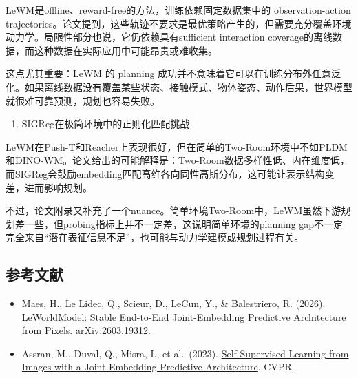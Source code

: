LeWM是offline、reward-free的方法，训练依赖固定数据集中的 observation-action trajectories。论文提到，这些轨迹不要求是最优策略产生的，但需要充分覆盖环境动力学。局限性部分也说，它仍依赖具有sufficient interaction coverage的离线数据，而这种数据在实际应用中可能昂贵或难收集。

这点尤其重要：LeWM 的 planning 成功并不意味着它可以在训练分布外任意泛化。如果离线数据没有覆盖某些状态、接触模式、物体姿态、动作后果，世界模型就很难可靠预测，规划也容易失败。

\begin{enumerate}
\def\labelenumi{\arabic{enumi}.}
\setcounter{enumi}{4}
\tightlist
\item
  SIGReg在极简环境中的正则化匹配挑战
\end{enumerate}

LeWM在Push-T和Reacher上表现很好，但在简单的Two-Room环境中不如PLDM和DINO-WM。论文给出的可能解释是：Two-Room数据多样性低、内在维度低，而SIGReg会鼓励embedding匹配高维各向同性高斯分布，这可能让表示结构变差，进而影响规划。

不过，论文附录又补充了一个nuance。简单环境Two-Room中，LeWM虽然下游规划差一些，但probing指标上并不一定差，这说明简单环境的planning gap不一定完全来自``潜在表征信息不足''，也可能与动力学建模或规划过程有关。

\hypertarget{ux53c2ux8003ux6587ux732e-191}{%
\subsection{参考文献}\label{ux53c2ux8003ux6587ux732e-191}}

\begin{itemize}
\tightlist
\item
  Maes, H., Le Lidec, Q., Scieur, D., LeCun, Y., \& Balestriero, R. (2026). \href{https://arxiv.org/abs/2603.19312}{LeWorldModel: Stable End-to-End Joint-Embedding Predictive Architecture from Pixels}. arXiv:2603.19312.
\item
  Assran, M., Duval, Q., Misra, I., et al.~(2023). \href{https://arxiv.org/abs/2301.08243}{Self-Supervised Learning from Images with a Joint-Embedding Predictive Architecture}. CVPR.
\end{itemize}

\clearpage
